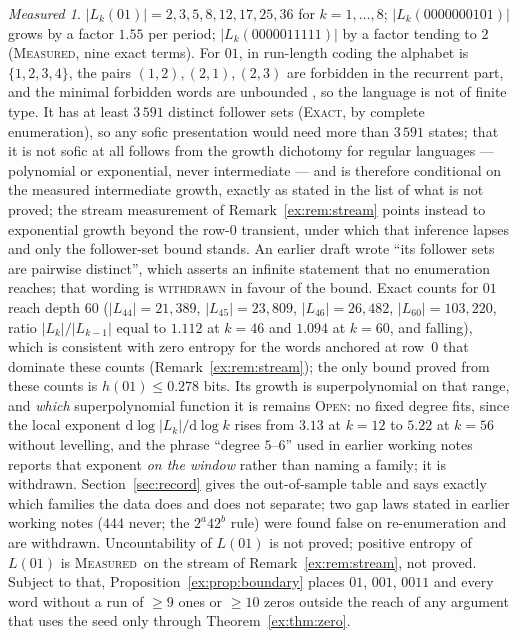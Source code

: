 \documentclass[11pt]{article}
\theoremstyle{definition}
\theoremstyle{remark}
\newtheorem*{measured}{Measured}
\newcommand{\EXACT}{\textsc{Exact}}
\newcommand{\MEASURED}{\textsc{Measured}}
\newcommand{\OPEN}{\textsc{Open}}
\begin{document}
\begin{measured}
$|L_k(01)|=2,3,5,8,12,17,25,36$ for $k=1,\dots,8$; $|L_k(0000000101)|$ grows by a factor $1.55$ per period; $|L_k(0000011111)|$ by a factor tending to $2$ (\MEASURED, nine exact terms). For $01$, in run-length coding the alphabet is $\{1,2,3,4\}$, the pairs $(1,2),(2,1),(2,3)$ are forbidden in the recurrent part, and the minimal forbidden words are unbounded \cite[\S11]{Q}, so the language is not of finite type. It has at least $3\,591$ distinct follower sets (\EXACT, by complete enumeration), so any sofic presentation would need more than $3\,591$ states; that it is not sofic at all follows from the growth dichotomy for regular languages --- polynomial or exponential, never intermediate --- and is therefore conditional on the measured intermediate growth, exactly as stated in the list of what is not proved; the stream measurement of Remark~\ref{ex:rem:stream} points instead to exponential growth beyond the row-$0$ transient, under which that inference lapses and only the follower-set bound stands. An earlier draft wrote ``its follower sets are pairwise distinct'', which asserts an infinite statement that no enumeration reaches; that wording is \textsc{withdrawn} in favour of the bound. Exact counts for $01$ reach depth $60$ ($|L_{44}|=21{,}389$, $|L_{45}|=23{,}809$, $|L_{46}|=26{,}482$, $|L_{60}|=103{,}220$, ratio $|L_k|/|L_{k-1}|$ equal to $1.112$ at $k=46$ and $1.094$ at $k=60$, and falling), which is consistent with zero entropy for the words anchored at row~$0$ that dominate these counts (Remark~\ref{ex:rem:stream}); the only bound proved from these counts is $h(01)\le0.278$ bits. Its growth is superpolynomial on that range, and \emph{which} superpolynomial function it is remains \OPEN: no fixed degree fits, since the local exponent $\mathrm d\log|L_k|/\mathrm d\log k$ rises from $3.13$ at $k=12$ to $5.22$ at $k=56$ without levelling, and the phrase ``degree $5$--$6$'' used in earlier working notes reports that exponent \emph{on the window} rather than naming a family; it is withdrawn. Section~\ref{sec:record} gives the out-of-sample table and says exactly which families the data does and does not separate; two gap laws stated in earlier working notes ($444$ never; the $2^a42^b$ rule) were found false on re-enumeration and are withdrawn. Uncountability of $L(01)$ is not proved; positive entropy of $L(01)$ is \MEASURED\ on the stream of Remark~\ref{ex:rem:stream}, not proved. Subject to that, Proposition~\ref{ex:prop:boundary} places $01$, $001$, $0011$ and every word without a run of $\ge9$ ones or $\ge10$ zeros outside the reach of any argument that uses the seed only through Theorem~\ref{ex:thm:zero}.
\end{measured}
\end{document}
